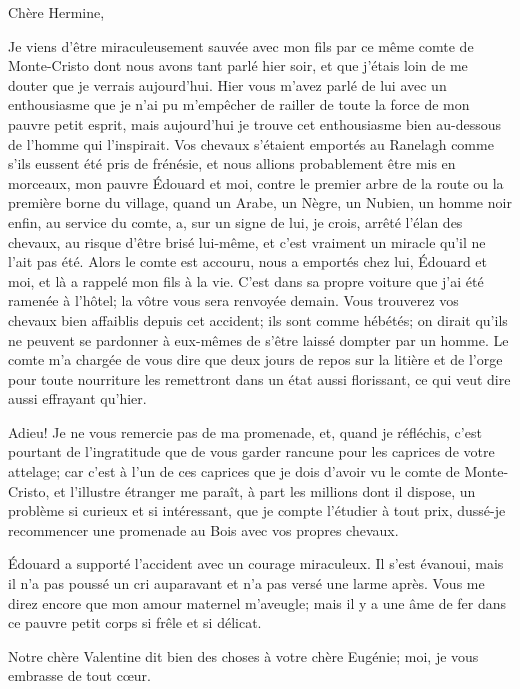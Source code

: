 \begin{mail}{}{Chère Hermine,}

Je viens d'être miraculeusement sauvée avec mon fils par ce même comte de Monte-Cristo dont nous avons tant parlé hier soir, et que j'étais loin de me douter que je verrais aujourd'hui. Hier vous m'avez parlé de lui avec un enthousiasme que je n'ai pu m'empêcher de railler de toute la force de mon pauvre petit esprit, mais aujourd'hui je trouve cet enthousiasme bien au-dessous de l'homme qui l'inspirait. Vos chevaux s'étaient emportés au Ranelagh comme s'ils eussent été pris de frénésie, et nous allions probablement être mis en morceaux, mon pauvre Édouard et moi, contre le premier arbre de la route ou la première borne du village, quand un Arabe, un Nègre, un Nubien, un homme noir enfin, au service du comte, a, sur un signe de lui, je crois, arrêté l'élan des chevaux, au risque d'être brisé lui-même, et c'est vraiment un miracle qu'il ne l'ait pas été. Alors le comte est accouru, nous a emportés chez lui, Édouard et moi, et là a rappelé mon fils à la vie. C'est dans sa propre voiture que j'ai été ramenée à l'hôtel; la vôtre vous sera renvoyée demain. Vous trouverez vos chevaux bien affaiblis depuis cet accident; ils sont comme hébétés; on dirait qu'ils ne peuvent se pardonner à eux-mêmes de s'être laissé dompter par un homme. Le comte m'a chargée de vous dire que deux jours de repos sur la litière et de l'orge pour toute nourriture les remettront dans un état aussi florissant, ce qui veut dire aussi effrayant qu'hier. 

Adieu! Je ne vous remercie pas de ma promenade, et, quand je réfléchis, c'est pourtant de l'ingratitude que de vous garder rancune pour les caprices de votre attelage; car c'est à l'un de ces caprices que je dois d'avoir vu le comte de Monte-Cristo, et l'illustre étranger me paraît, à part les millions dont il dispose, un problème si curieux et si intéressant, que je compte l'étudier à tout prix, dussé-je recommencer une promenade au Bois avec vos propres chevaux. 

Édouard a supporté l'accident avec un courage miraculeux. Il s'est évanoui, mais il n'a pas poussé un cri auparavant et n'a pas versé une larme après. Vous me direz encore que mon amour maternel m'aveugle; mais il y a une âme de fer dans ce pauvre petit corps si frêle et si délicat. 

Notre chère Valentine dit bien des choses à votre chère Eugénie; moi, je vous embrasse de tout cœur. 



\end{mail}

